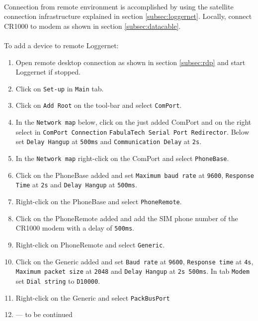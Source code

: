 \paragraph{}
Connection from remote environment is accomplished by using the satellite connection infrastructure explained in section \ref{subsec:loggernet}.
Locally, connect CR1000 to modem as shown in section \ref{subsec:datacable}.
\paragraph{}
To add a device to remote Loggernet:
\begin{enumerate}
	\item Open remote desktop connection as shown in section \ref{subsec:rdp} and start Loggernet if stopped.
	\item Click on {\tt Set-up} in {\tt Main} tab.
	\item Click on {\tt Add Root} on the tool-bar and select {\tt ComPort}.
	\item In the {\tt Network map} below, click on the just added ComPort and on the right select in {\tt ComPort Connection} {\tt FabulaTech Serial Port Redirector}. Below set {\tt Delay Hangup} at {\tt 500ms} and {\tt Communication Delay} at {\tt 2s}.
	\item In the {\tt Network map} right-click on the ComPort and select {\tt PhoneBase}.
	\item Click on the PhoneBase added and set {\tt Maximum baud rate} at {\tt 9600}, {\tt Response Time} at {\tt 2s} and {\tt Delay Hangup} at {\tt 500ms}.
	\item Right-click on the PhoneBase and select {\tt PhoneRemote}.
	\item Click on the PhoneRemote added and add the SIM phone number of the CR1000 modem with a delay of {\tt 500ms}.
	\item Right-click on PhoneRemote and select {\tt Generic}.
	\item Click on the Generic added and set {\tt Baud rate} at {\tt 9600}, {\tt Response time} at {\tt 4s}, {\tt Maximum packet size} at {\tt 2048} and {\tt Delay Hangup} at {\tt 2s 500ms}. In tab {\tt Modem} set {\tt Dial string} to {\tt D10000}.
	\item Right-click on the Generic and select {\tt PackBusPort}
	\item --- to be continued
\end{enumerate}
